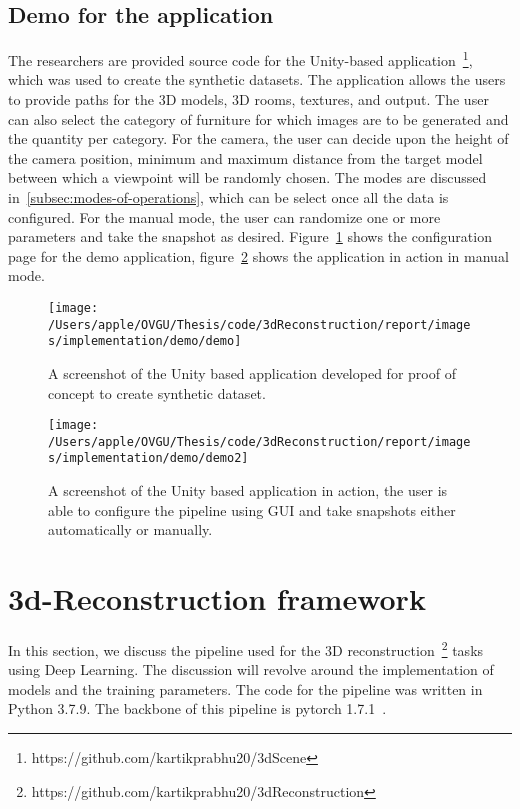 \subsection{Demo for the application}\label{subsec:demo}

The researchers are provided source code for the Unity-based application~\footnote{https://github.com/kartikprabhu20/3dScene}, which was used to create the synthetic datasets.
The application allows the users to provide paths for the 3D models, 3D rooms, textures, and output.
The user can also select the category of furniture for which images are to be generated and the quantity per category.
For the camera, the user can decide upon the height of the camera position, minimum and maximum distance from the target model between which a viewpoint will be randomly chosen.
The modes are discussed in~\ref{subsec:modes-of-operations}, which can be select once all the data is configured.
For the manual mode, the user can randomize one or more parameters and take the snapshot as desired.
Figure~\ref{fig:demo1} shows the configuration page for the demo application, figure~\ref{fig:demo2} shows the application in action in manual mode.

\begin{figure}
    \centering
    \texttt{[image: /Users/apple/OVGU/Thesis/code/3dReconstruction/report/images/implementation/demo/demo]}
    \caption{A screenshot of the Unity based application developed for proof of concept to create synthetic dataset.}
    \label{fig:demo1}
\end{figure}

\begin{figure}
    \centering
    \texttt{[image: /Users/apple/OVGU/Thesis/code/3dReconstruction/report/images/implementation/demo/demo2]}
    \caption{A screenshot of the Unity based application in action, the user is able to configure the pipeline using GUI and take snapshots either automatically or manually.}
    \label{fig:demo2}
\end{figure}

\section{3d-Reconstruction framework}\label{sec:3d-reconstruction-framework}

In this section, we discuss the pipeline used for the 3D reconstruction~\footnote{https://github.com/kartikprabhu20/3dReconstruction} tasks using Deep Learning.
The discussion will revolve around the implementation of models and the training parameters.
The code for the pipeline was written in Python 3.7.9.
The backbone of this pipeline is pytorch 1.7.1~\cite{NEURIPS2019_9015}.

